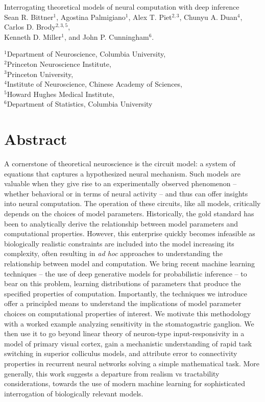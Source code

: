 \documentclass[11pt]{article}
\begin{document}
\medskip        

\thispagestyle{plain}
{\Large Interrogating theoretical models of neural computation with deep inference} \\
Sean R. Bittner$^{1}$, Agostina Palmigiano$^{1}$, Alex T. Piet$^{2,3}$, Chunyu A. Duan$^{4}$, Carlos D. Brody$^{2,3,5}$, \\
Kenneth D. Miller$^{1}$, and John P. Cunningham$^{6}$.

{\small
$^{1}$Department of Neuroscience, Columbia University, \\
$^{2}$Princeton Neuroscience Institute, \\
$^{3}$Princeton University, \\
$^{4}$Institute of Neuroscience, Chinese Academy of Sciences, \\
$^{5}$Howard Hughes Medical Institute, \\
$^{6}$Department of Statistics, Columbia University
}

\linenumbers
\section{Abstract}
A cornerstone of theoretical neuroscience is the circuit model: a system of equations that captures a hypothesized neural mechanism.  
Such models are valuable when they give rise to an experimentally observed phenomenon -- whether behavioral or in terms of neural activity -- and thus can offer insights into neural computation.
The operation of these circuits, like all models, critically depends on the choices of model parameters.
Historically, the gold standard has been to analytically derive the relationship between model parameters and computational properties.  
However, this enterprise quickly becomes infeasible as biologically realistic constraints are included into the model increasing its complexity, often resulting in \emph{ad hoc} approaches to understanding the relationship between model and computation.  
We bring recent machine learning techniques -- the use of deep generative models for probabilistic inference -- to bear on this problem, learning distributions of parameters that produce the specified properties of computation.   
Importantly, the techniques we introduce offer a principled means to understand the implications of model parameter choices on computational properties of interest.  
We motivate this methodology with a worked example analyzing sensitivity in the stomatogastric ganglion.  
We then use it to go beyond linear theory of neuron-type input-responsivity in a model of primary visual cortex, gain a mechanistic understanding of rapid task switching in superior colliculus models, and attribute error to connectivity properties in recurrent neural networks solving a simple mathematical task. 
More generally, this work suggests a departure from realism vs tractability considerations, towards the use of modern machine learning for sophisticated interrogation of biologically relevant models.
\end{document}
